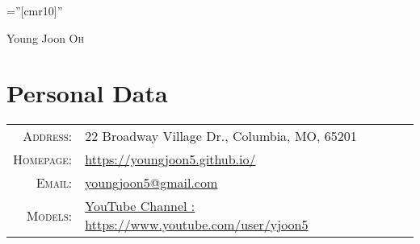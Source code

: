 \documentclass[a4paper,10pt]{article}
\begin{document}
 


\font\fb=''[cmr10]'' %

\par{\centering
		{\huge Young Joon \textsc{Oh}
	}\bigskip\par}


\section{Personal Data}

\begin{tabular}{rl}
    \textsc{Address:}   & 22 Broadway Village Dr., Columbia, MO, 65201\\
    \textsc{Homepage:}   & \href{https://youngjoon5.github.io/}{https://youngjoon5.github.io/}\\
    \textsc{Email:}      & \href{mailto:youngjoon5@gmail.com}{youngjoon5@gmail.com}\\
    \textsc{Models:}   & \href{https://www.youtube.com/user/yjoon5}{YouTube Channel : https://www.youtube.com/user/yjoon5}\\
\end{tabular}


\end{document}
